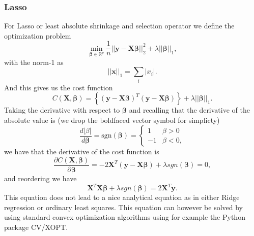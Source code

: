 \subsubsection{Lasso}
For Lasso or least absolute shrinkage and selection operator we define the optimization problem
$$
{\displaystyle \min_{\boldsymbol{\beta}\in
{\mathbb{R}}^{p}}}\frac{1}{n}\vert\vert \boldsymbol{y}-\boldsymbol{X}\boldsymbol{\beta}\vert\vert_2^2+\lambda\vert\vert \boldsymbol{\beta}\vert\vert_1,
$$
with the norm-1 as
$$
\vert\vert \boldsymbol{x}\vert\vert_1 = \sum_i \vert x_i\vert.
$$
And this gives us the cost function 
$$
C(\boldsymbol{X},\boldsymbol{\beta})=\left\{(\boldsymbol{y}-\boldsymbol{X}\boldsymbol{\beta})^T(\boldsymbol{y}-\boldsymbol{X}\boldsymbol{\beta})\right\}+\lambda\vert\vert\boldsymbol{\beta}\vert\vert_1.
$$
Taking the derivative with respect to $\boldsymbol{\beta}$ and recalling that the derivative of the absolute value is (we drop the boldfaced vector symbol for simplicty)
$$
\frac{d \vert \beta\vert}{d \boldsymbol{\beta}}=\mathrm{sgn}(\boldsymbol{\beta})=\left\{\begin{array}{cc} 1 & \beta > 0 \\-1 & \beta < 0, \end{array}\right.
$$
we have that the derivative of the cost function is
$$
\frac{\partial C(\boldsymbol{X},\boldsymbol{\beta})}{\partial \boldsymbol{\beta}}=-2\boldsymbol{X}^T(\boldsymbol{y}-\boldsymbol{X}\boldsymbol{\beta})+\lambda sgn(\boldsymbol{\beta})=0,
$$
and reordering we have
$$
\boldsymbol{X}^T\boldsymbol{X}\boldsymbol{\beta}+\lambda sgn(\boldsymbol{\beta})=2\boldsymbol{X}^T\boldsymbol{y}.
$$
This equation does not lead to a nice analytical equation as in either Ridge regression or ordinary least squares. This equation can however be solved by using standard convex optimization algorithms using for example the Python package CV\slash XOPT.

